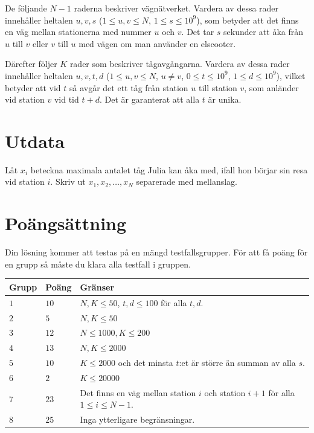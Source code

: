 De följande $N-1$ raderna beskriver vägnätverket. Vardera av dessa rader innehåller heltalen $u,v,s$
($1 \leq u, v \leq N$, $1 \leq s \leq 10^9$), som betyder att det finns en väg mellan
stationerna med nummer $u$ och $v$. Det tar $s$ sekunder att åka
från $u$ till $v$ eller $v$ till $u$ med vägen om man använder en elscooter.

Därefter följer $K$ rader som beskriver tågavgångarna. Vardera av dessa rader innehåller heltalen
$u,v,t,d$ ($1 \leq u,v \leq N$, $u \neq v$, $0 \leq t \leq 10^9$, $1 \leq d \leq 10^9$), vilket betyder att
vid $t$ så avgår det ett tåg från station $u$ till station $v$, som anländer vid station $v$
vid tid $t+d$. Det är garanterat att alla $t$ är unika. 

\section*{Utdata}
Låt $x_i$ beteckna maximala antalet tåg Julia kan åka med, ifall hon börjar sin resa vid station $i$.
Skriv ut $x_1,x_2,\ldots,x_N$ separerade med mellanslag.

\section*{Poängsättning}
Din lösning kommer att testas på en mängd testfallsgrupper.
För att få poäng för en grupp så måste du klara alla testfall i gruppen.

\noindent
\begin{tabular}{| l | l | p{12cm} |}
  \hline
  \textbf{Grupp} & \textbf{Poäng} & \textbf{Gränser} \\ \hline
  $1$    & $10$       & $N, K \leq 50$, $t, d \leq 100$ för alla $t,d$. \\ \hline
  $2$    & $5$        & $N, K \leq 50$ \\ \hline
  $3$    & $12$       & $N \leq 1000, K \leq 200$ \\ \hline
  $4$    & $13$       & $N, K \leq 2000$ \\ \hline
  $5$    & $10$       & $K \leq 2000$ och det minsta $t$:et är större än summan av alla $s$. \\ \hline
  $6$    & $2$        & $K \leq 20000$ \\ \hline
  $7$    & $23$       & Det finns en väg mellan station $i$ och station $i+1$ för alla $1 \leq i \leq N-1$. \\ \hline
  $8$    & $25$       & Inga ytterligare begränsningar. \\ \hline
\end{tabular}


